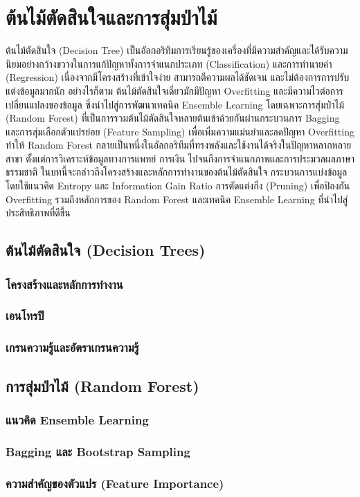 \chapter{ต้นไม้ตัดสินใจและการสุ่มป่าไม้}
ต้นไม้ตัดสินใจ (Decision Tree) เป็นอัลกอริทึมการเรียนรู้ของเครื่องที่มีความสำคัญและได้รับความนิยมอย่างกว้างขวางในการแก้ปัญหาทั้งการจำแนกประเภท (Classification) และการทำนายค่า (Regression) เนื่องจากมีโครงสร้างที่เข้าใจง่าย สามารถตีความผลได้ชัดเจน และไม่ต้องการการปรับแต่งข้อมูลมากนัก อย่างไรก็ตาม ต้นไม้ตัดสินใจเดี่ยวมักมีปัญหา Overfitting และมีความไวต่อการเปลี่ยนแปลงของข้อมูล ซึ่งนำไปสู่การพัฒนาเทคนิค Ensemble Learning โดยเฉพาะการสุ่มป่าไม้ (Random Forest) ที่เป็นการรวมต้นไม้ตัดสินใจหลายต้นเข้าด้วยกันผ่านกระบวนการ Bagging และการสุ่มเลือกตัวแปรย่อย (Feature Sampling) เพื่อเพิ่มความแม่นยำและลดปัญหา Overfitting ทำให้ Random Forest กลายเป็นหนึ่งในอัลกอริทึมที่ทรงพลังและใช้งานได้จริงในปัญหาหลากหลายสาขา ตั้งแต่การวิเคราะห์ข้อมูลทางการแพทย์ การเงิน ไปจนถึงการจำแนกภาพและการประมวลผลภาษาธรรมชาติ ในบทนี้จะกล่าวถึงโครงสร้างและหลักการทำงานของต้นไม้ตัดสินใจ กระบวนการแบ่งข้อมูลโดยใช้แนวคิด Entropy และ Information Gain Ratio การตัดแต่งกิ่ง (Pruning) เพื่อป้องกัน Overfitting รวมถึงหลักการของ Random Forest และเทคนิค Ensemble Learning ที่นำไปสู่ประสิทธิภาพที่ดีขึ้น


\section{ต้นไม้ตัดสินใจ (Decision Trees)}
\subsection{โครงสร้างและหลักการทำงาน}
\subsection{เอนโทรปี}
\subsection{เกรนความรู้และอัตราเกรนความรู้}


\section{การสุ่มป่าไม้ (Random Forest)}
\subsection{แนวคิด Ensemble Learning}
\subsection{Bagging และ Bootstrap Sampling}
\subsection{ความสำคัญของตัวแปร (Feature Importance)}



\newpage
